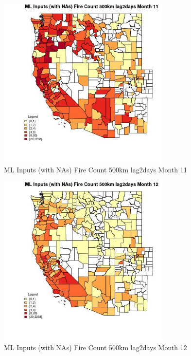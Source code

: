\begin{figure} 
\centering  
\includegraphics[width=0.77\textwidth]{Code_Outputs/Report_ML_input_PM25_Step4_part_e_de_duplicated_aves_compiled_2019-05-20wNAs_CountyFire_Count_500km_lag2daysmedianMonth11.jpg} 
\caption{\label{fig:Report_ML_input_PM25_Step4_part_e_de_duplicated_aves_compiled_2019-05-20wNAsCountyFire_Count_500km_lag2daysmedianMonth11}ML Inputs (with NAs) Fire Count 500km lag2days Month 11} 
\end{figure} 
 

\begin{figure} 
\centering  
\includegraphics[width=0.77\textwidth]{Code_Outputs/Report_ML_input_PM25_Step4_part_e_de_duplicated_aves_compiled_2019-05-20wNAs_CountyFire_Count_500km_lag2daysmedianMonth12.jpg} 
\caption{\label{fig:Report_ML_input_PM25_Step4_part_e_de_duplicated_aves_compiled_2019-05-20wNAsCountyFire_Count_500km_lag2daysmedianMonth12}ML Inputs (with NAs) Fire Count 500km lag2days Month 12} 
\end{figure} 
 

